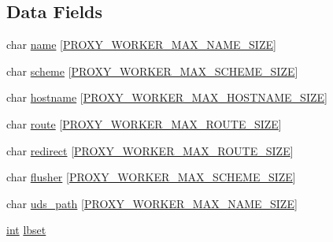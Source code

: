 \subsection*{Data Fields}
\begin{DoxyCompactItemize}
\item 
char \hyperlink{structproxy__worker__shared_a5cc7bac10e746c287d81e723ddd5bad4}{name} \mbox{[}\hyperlink{group__MOD__PROXY_ga751f27e58f7f2c2ac2921fcbb9f28624}{P\+R\+O\+X\+Y\+\_\+\+W\+O\+R\+K\+E\+R\+\_\+\+M\+A\+X\+\_\+\+N\+A\+M\+E\+\_\+\+S\+I\+ZE}\mbox{]}
\item 
char \hyperlink{structproxy__worker__shared_a04bc47e7a3670347a1ed46d28b757369}{scheme} \mbox{[}\hyperlink{group__MOD__PROXY_ga79e4d8747fce219f39b35c301ca22b71}{P\+R\+O\+X\+Y\+\_\+\+W\+O\+R\+K\+E\+R\+\_\+\+M\+A\+X\+\_\+\+S\+C\+H\+E\+M\+E\+\_\+\+S\+I\+ZE}\mbox{]}
\item 
char \hyperlink{structproxy__worker__shared_a148cc100cd1adc298f72d5b290e083f8}{hostname} \mbox{[}\hyperlink{group__MOD__PROXY_ga138c44ad87fee2de3c6bde581b18d140}{P\+R\+O\+X\+Y\+\_\+\+W\+O\+R\+K\+E\+R\+\_\+\+M\+A\+X\+\_\+\+H\+O\+S\+T\+N\+A\+M\+E\+\_\+\+S\+I\+ZE}\mbox{]}
\item 
char \hyperlink{structproxy__worker__shared_a81e88d50ff982a71c76531f19a4fd91e}{route} \mbox{[}\hyperlink{group__MOD__PROXY_ga2728b95ba24f7a531b844a9a851a9392}{P\+R\+O\+X\+Y\+\_\+\+W\+O\+R\+K\+E\+R\+\_\+\+M\+A\+X\+\_\+\+R\+O\+U\+T\+E\+\_\+\+S\+I\+ZE}\mbox{]}
\item 
char \hyperlink{structproxy__worker__shared_ab4bf20ff76b47f493f33d3f79b9f022d}{redirect} \mbox{[}\hyperlink{group__MOD__PROXY_ga2728b95ba24f7a531b844a9a851a9392}{P\+R\+O\+X\+Y\+\_\+\+W\+O\+R\+K\+E\+R\+\_\+\+M\+A\+X\+\_\+\+R\+O\+U\+T\+E\+\_\+\+S\+I\+ZE}\mbox{]}
\item 
char \hyperlink{structproxy__worker__shared_a3090ca65efabd91a661c4cce2403228f}{flusher} \mbox{[}\hyperlink{group__MOD__PROXY_ga79e4d8747fce219f39b35c301ca22b71}{P\+R\+O\+X\+Y\+\_\+\+W\+O\+R\+K\+E\+R\+\_\+\+M\+A\+X\+\_\+\+S\+C\+H\+E\+M\+E\+\_\+\+S\+I\+ZE}\mbox{]}
\item 
char \hyperlink{structproxy__worker__shared_a2a079addb146a66a1246eb8518b7b299}{uds\+\_\+path} \mbox{[}\hyperlink{group__MOD__PROXY_ga751f27e58f7f2c2ac2921fcbb9f28624}{P\+R\+O\+X\+Y\+\_\+\+W\+O\+R\+K\+E\+R\+\_\+\+M\+A\+X\+\_\+\+N\+A\+M\+E\+\_\+\+S\+I\+ZE}\mbox{]}
\item 
\hyperlink{pcre_8txt_a42dfa4ff673c82d8efe7144098fbc198}{int} \hyperlink{structproxy__worker__shared_ac838dcc0b282ea1e5a0bc70f7617cdab}{lbset}

\end{DoxyCompactItemize}
